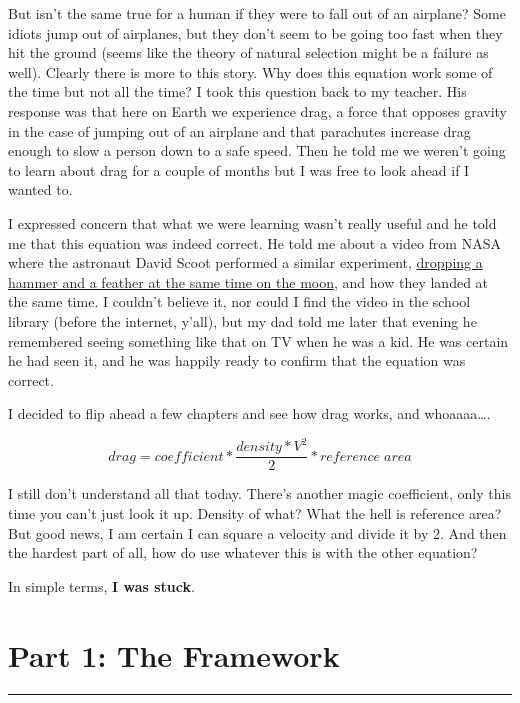 \documentclass[
]{book}
\begin{document}
But isn't the same true for a human if they were to fall out of an airplane? Some idiots jump out of airplanes, but they don't seem to be going too fast when they hit the ground (seems like the theory of natural selection might be a failure as well). Clearly there is more to this story. Why does this equation work some of the time but not all the time? I took this question back to my teacher. His response was that here on Earth we experience drag, a force that opposes gravity in the case of jumping out of an airplane and that parachutes increase drag enough to slow a person down to a safe speed. Then he told me we weren't going to learn about drag for a couple of months but I was free to look ahead if I wanted to.

I expressed concern that what we were learning wasn't really useful and he told me that this equation was indeed correct. He told me about a video from NASA where the astronaut David Scoot performed a similar experiment, \href{https://nssdc.gsfc.nasa.gov/planetary/lunar/apollo_15_feather_drop.html}{dropping a hammer and a feather at the same time on the moon}, and how they landed at the same time. I couldn't believe it, nor could I find the video in the school library (before the internet, y'all), but my dad told me later that evening he remembered seeing something like that on TV when he was a kid. He was certain he had seen it, and he was happily ready to confirm that the equation was correct.

I decided to flip ahead a few chapters and see how drag works, and whoaaaa\ldots.

\[drag = coefficient * \frac{density * V^2}{2} * reference\;area\]

I still don't understand all that today. There's another magic coefficient, only this time you can't just look it up. Density of what? What the hell is reference area? But good news, I am certain I can square a velocity and divide it by 2. And then the hardest part of all, how do use whatever this is with the other equation?

In simple terms, \textbf{I was stuck}.

\hypertarget{part1}{%
\chapter*{Part 1: The Framework}\label{part1}}

\begin{center}\rule{0.5\linewidth}{0.5pt}\end{center}
\end{document}
